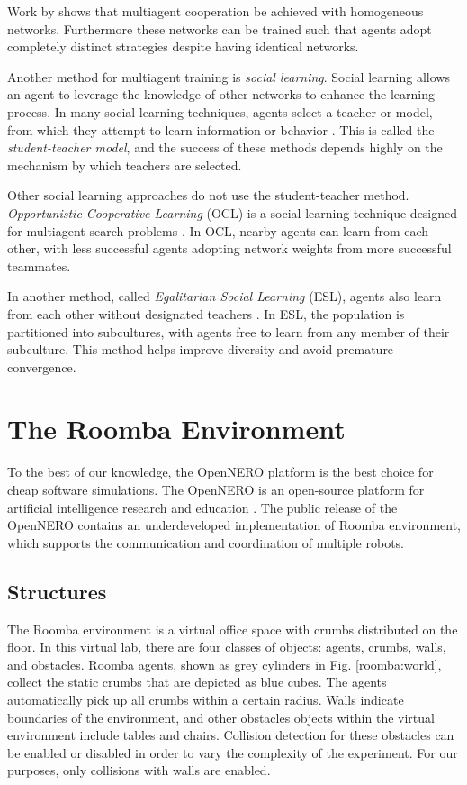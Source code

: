 \documentclass[conference]{IEEEtran}
\begin{document}
Work by \cite{bryant2003neuroevolution} shows that multiagent cooperation be achieved with homogeneous networks. Furthermore these networks can be trained such that agents adopt completely distinct strategies despite having identical networks.

Another method for multiagent training is \textit{social learning}. Social learning allows an agent to leverage the knowledge of other networks to enhance the learning process.
In many social learning techniques, agents select a teacher or model, from which they attempt to learn information or behavior \cite{acerbi2006cultural}. This is called the \textit{student-teacher model}, and the success of these methods depends highly on the mechanism by which teachers are selected.

Other social learning approaches do not use the student-teacher method. \textit{Opportunistic Cooperative Learning} (OCL) is a social learning technique designed for multiagent search problems \cite{yang2002ocl}. In OCL, nearby agents can learn from each other, with less successful agents adopting network weights from more successful teammates. 

In another method, called \textit{Egalitarian Social Learning} (ESL), agents also learn from each other without designated teachers \cite{miikkulainen2012multiagent}. In ESL, the population is partitioned into subcultures, with agents free to learn from any member of their subculture. This method helps improve diversity and avoid premature convergence.


\section{The Roomba Environment} \label{section:environment}
To the best of our knowledge, the OpenNERO platform is the best choice for
cheap software simulations. 
The OpenNERO is an open-source platform for artificial intelligence
research and education \cite{karpov2008opennero}. 
The public release of the OpenNERO contains an underdeveloped implementation
of Roomba environment, which supports the communication and coordination of
multiple robots.

\subsection{Structures}
The Roomba environment is a virtual office space with crumbs distributed on
the floor.
In this virtual lab, there are four classes of objects: agents, crumbs, walls,
and obstacles. 
Roomba agents, shown as grey cylinders in Fig. \ref{roomba:world}, collect the static crumbs that are depicted as blue cubes.  The
agents automatically pick up all crumbs within a certain radius. 
Walls indicate boundaries of the environment, and other obstacles objects within the virtual environment include tables and chairs. Collision detection for these obstacles can be enabled or disabled in order to vary the complexity of the experiment. For our purposes, only collisions with walls are enabled.
\end{document}
